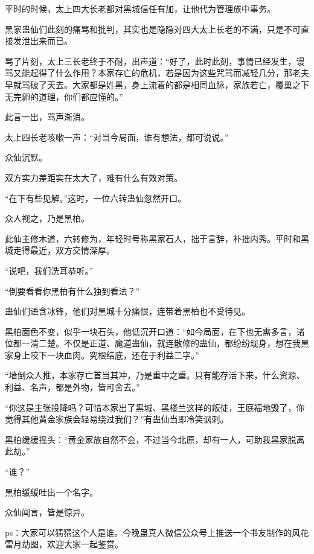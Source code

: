 \begin{this_body}
平时的时候，太上四大长老都对黑城信任有加，让他代为管理族中事务。

黑家蛊仙们此刻的痛骂和批判，其实也是隐隐对四大太上长老的不满，只是不可直接发泄出来而已。

骂了片刻，太上三长老终于不耐，出声道：“好了，此时此刻，事情已经发生，谩骂又能起得了什么作用？本家存亡的危机，若是因为这些咒骂而减轻几分，那老夫早就骂破了天去。大家都是姓黑，身上流着的都是相同血脉，家族若亡，覆巢之下无完卵的道理，你们都应懂的。”

此言一出，骂声渐消。

太上四长老咳嗽一声：“对当今局面，谁有想法，都可说说。”

众仙沉默。

双方实力差距实在太大了，难有什么有效对策。

“在下有些见解。”这时，一位六转蛊仙忽然开口。

众人视之，乃是黑柏。

此仙主修木道，六转修为，年轻时号称黑家石人，拙于言辞，朴拙内秀。平时和黑城走得最近，双方交情深厚。

“说吧，我们洗耳恭听。”

“倒要看看你黑柏有什么独到看法？”

蛊仙们语含冰锋，他们对黑城十分痛恨，连带着黑柏也不受待见。

黑柏面色不变，似乎一块石头，他低沉开口道：“如今局面，在下也无需多言，诸位都一清二楚。不仅是正道、魔道蛊仙，就连散修的蛊仙，都纷纷现身，想在我黑家身上咬下一块血肉。究根结底，还在于利益二字。”

“墙倒众人推，本家存亡首当其冲，乃是重中之重。只有能存活下来，什么资源、利益、名声，都是外物，皆可舍去。”

“你这是主张投降吗？可惜本家出了黑城、黑楼兰这样的叛徒，王庭福地毁了，你觉得其他黄金家族会轻易绕过我们？”有蛊仙当即冷笑讽刺。

黑柏缓缓摇头：“黄金家族自然不会，不过当今北原，却有一人，可助我黑家脱离此劫。”

“谁？”

黑柏缓缓吐出一个名字。

众仙闻言，皆是惊异。

ps：大家可以猜猜这个人是谁。今晚蛊真人微信公众号上推送一个书友制作的风花雪月劫图，欢迎大家一起鉴赏。

\end{this_body}

